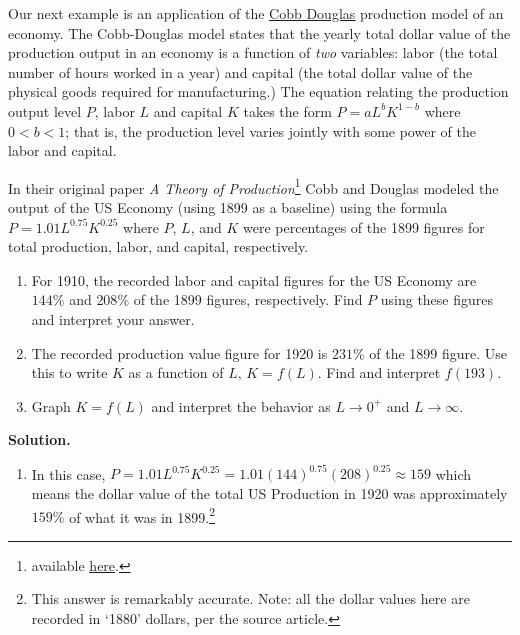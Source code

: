 \documentclass{ximera}
\begin{document}
 Our next example is an application of the  \href{https://en.wikipedia.org/wiki/Cobb-Douglas_production_function}{\underline{Cobb Douglas}} production model of an economy.  The Cobb-Douglas model states that the yearly total dollar value of the production output in an economy is a function of \textit{two} variables:   labor (the total number of hours worked in a year) and capital (the total dollar value of the physical goods required for manufacturing.) The equation relating the production output level $P$, labor $L$ and capital $K$ takes the form $P = a L^{b} K^{1-b}$ where $0 < b < 1$; that is, the production level varies jointly with some power of the labor and capital.  

\begin{example} \label{CobbDouglasEx}  In their original paper \textit{A Theory of Production}\footnote{available \href{http://bit.ly/2dxlstt}{\underline{here}}.} Cobb and Douglas modeled the output of the US Economy (using 1899 as a baseline) using the formula $P = 1.01 L^{0.75} K^{0.25}$ where $P$, $L$, and $K$ were percentages of the 1899 figures for total production, labor, and capital, respectively.

\begin{enumerate}

\item  For 1910, the recorded labor and capital figures for the US Economy are $144 \%$ and $208 \%$ of the 1899 figures, respectively.  Find $P$ using these figures and interpret your answer.

\item  The recorded production value figure for 1920 is $231 \%$ of the 1899 figure.  Use this to write $K$ as a function of $L$, $K = f(L)$.  Find and interpret $f(193)$.

\item  Graph $K = f(L)$ and interpret the behavior as $L \rightarrow 0^{+}$ and $L \rightarrow \infty$.


\end{enumerate}

{\bf Solution.}

\begin{enumerate}

\item  In this case, $P = 1.01 L^{0.75} K^{0.25} = 1.01 (144)^{0.75} (208)^{0.25} \approx 159$ which means the dollar value of the total US Production in 1920 was approximately $159 \%$ of what it was in 1899.\footnote{This answer is remarkably accurate. Note:  all the dollar values here are recorded in `1880' dollars, per the source article. }  



\end{enumerate}
\end{example}
\end{document}
